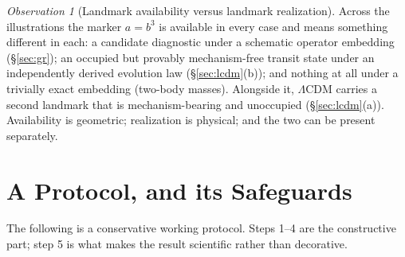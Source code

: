 \documentclass[11pt,a4paper]{article}
\theoremstyle{definition}
\theoremstyle{plain}
\theoremstyle{remark}
\newtheorem{observation}[definition]{Observation}
\begin{document}
\begin{observation}[Landmark availability versus landmark realization]
Across the illustrations the marker $a=b^{3}$ is available in every case and
means something different in each: a candidate diagnostic under a schematic
operator embedding (\S\ref{sec:gr}); an occupied but provably mechanism-free
transit state under an independently derived evolution law
(\S\ref{sec:lcdm}(b)); and nothing at all under a trivially exact embedding
(two-body masses). Alongside it, $\Lambda$CDM carries a second landmark that is
mechanism-bearing and unoccupied (\S\ref{sec:lcdm}(a)). Availability is
geometric; realization is physical; and the two can be present separately.
\end{observation}

\section{A Protocol, and its Safeguards}
\label{sec:protocol}

The following is a conservative working protocol. Steps 1--4 are the
constructive part; step 5 is what makes the result scientific rather than
decorative.
\end{document}
